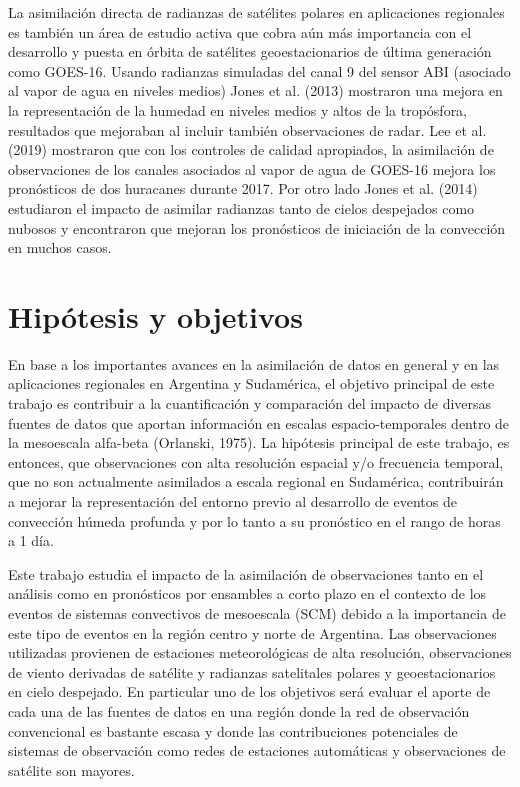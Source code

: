 \documentclass[12pt,oneside,a4paper]{reedthesis}
\begin{document}
La asimilación directa de radianzas de satélites polares en aplicaciones regionales es también un área de estudio activa que cobra aún más importancia con el desarrollo y puesta en órbita de satélites geoestacionarios de última generación como GOES-16. Usando radianzas simuladas del canal 9 del sensor ABI (asociado al vapor de agua en niveles medios) Jones et al. (2013) mostraron una mejora en la representación de la humedad en niveles medios y altos de la tropósfora, resultados que mejoraban al incluir también observaciones de radar. Lee et al. (2019) mostraron que con los controles de calidad apropiados, la asimilación de observaciones de los canales asociados al vapor de agua de GOES-16 mejora los pronósticos de dos huracanes durante 2017. Por otro lado Jones et al. (2014) estudiaron el impacto de asimilar radianzas tanto de cielos despejados como nubosos y encontraron que mejoran los pronósticos de iniciación de la convección en muchos casos.

\hypertarget{hipuxf3tesis-y-objetivos}{%
\section{Hipótesis y objetivos}\label{hipuxf3tesis-y-objetivos}}

En base a los importantes avances en la asimilación de datos en general y en las aplicaciones regionales en Argentina y Sudamérica, el objetivo principal de este trabajo es contribuir a la cuantificación y comparación del impacto de diversas fuentes de datos que aportan información en escalas espacio-temporales dentro de la mesoescala alfa-beta (Orlanski, 1975). La hipótesis principal de este trabajo, es entonces, que observaciones con alta resolución espacial y/o frecuencia temporal, que no son actualmente asimilados a escala regional en Sudamérica, contribuirán a mejorar la representación del entorno previo al desarrollo de eventos de convección húmeda profunda y por lo tanto a su pronóstico en el rango de horas a 1 día.

Este trabajo estudia el impacto de la asimilación de observaciones tanto en el análisis como en pronósticos por ensambles a corto plazo en el contexto de los eventos de sistemas convectivos de mesoescala (SCM) debido a la importancia de este tipo de eventos en la región centro y norte de Argentina. Las observaciones utilizadas provienen de estaciones meteorológicas de alta resolución, observaciones de viento derivadas de satélite y radianzas satelitales polares y geoestacionarios en cielo despejado. En particular uno de los objetivos será evaluar el aporte de cada una de las fuentes de datos en una región donde la red de observación convencional es bastante escasa y donde las contribuciones potenciales de sistemas de observación como redes de estaciones automáticas y observaciones de satélite son mayores.
\end{document}
